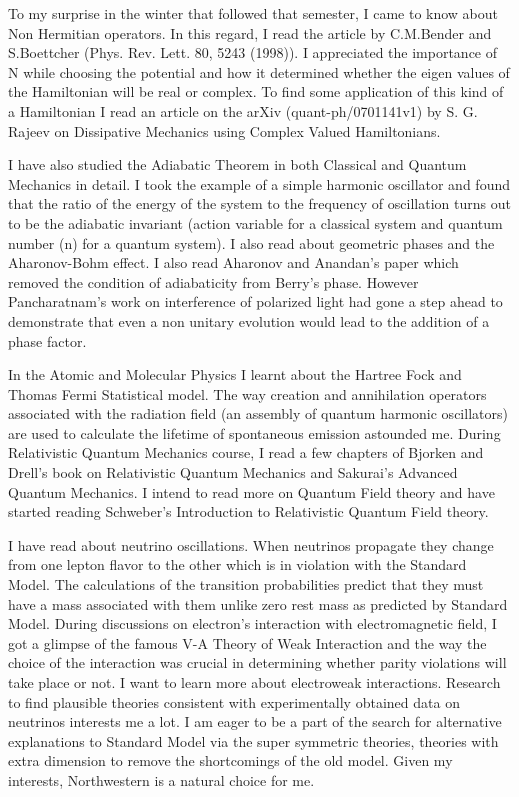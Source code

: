 \documentclass[12pt,a4paper,oneside]{amsart}
\begin{document}
To my surprise in the winter that followed that semester, I came to know about Non Hermitian operators. In this regard, I read the article by C.M.Bender and S.Boettcher (Phys. Rev. Lett. 80, 5243 (1998)). I appreciated the importance of N while choosing the potential and how it determined whether the eigen values of the Hamiltonian will be real or complex. To find some application of this kind of a Hamiltonian I read an article on the arXiv (quant-ph/0701141v1) by S. G. Rajeev on Dissipative Mechanics using Complex Valued Hamiltonians.

I have also studied the Adiabatic Theorem in both Classical and Quantum Mechanics in detail. I took the example of a simple harmonic oscillator and found that the ratio of the energy of the system to the frequency of oscillation turns out to be the adiabatic invariant (action variable for a classical system and quantum number (n) for a quantum system). I also read about geometric phases and the Aharonov-Bohm effect. I also read Aharonov and Anandan's paper which removed the condition of adiabaticity from Berry's phase. However Pancharatnam's work on interference of polarized light had gone a step ahead to demonstrate that even a non unitary evolution would lead to the addition of a phase factor.

In the Atomic and Molecular Physics I learnt about the Hartree Fock and Thomas Fermi Statistical model. The way creation and annihilation operators associated with the radiation field (an assembly of quantum harmonic oscillators) are used to calculate the lifetime of spontaneous emission astounded me. During Relativistic Quantum Mechanics course, I read a few chapters of Bjorken and Drell's book on Relativistic Quantum Mechanics and Sakurai's Advanced Quantum Mechanics. I intend to read more on Quantum Field theory and have started reading Schweber's Introduction to Relativistic Quantum Field theory. 

I have read about neutrino oscillations. When neutrinos propagate they change from one lepton flavor to the other which is in violation with the Standard Model. The calculations of the transition probabilities predict that they must have a mass associated with them unlike zero rest mass as predicted by Standard Model. During discussions on electron's interaction with electromagnetic field, I got a glimpse of the famous V-A Theory of Weak Interaction and the way the choice of the interaction was crucial in determining whether parity violations will take place or not. I want to learn more about electroweak interactions. Research to find plausible theories consistent with experimentally obtained data on neutrinos interests me a lot. I am eager to be a part of the search for alternative explanations to Standard Model via the super symmetric theories, theories with extra dimension to remove the shortcomings of the old model. Given my interests, Northwestern is a natural choice for me.
\end{document}
